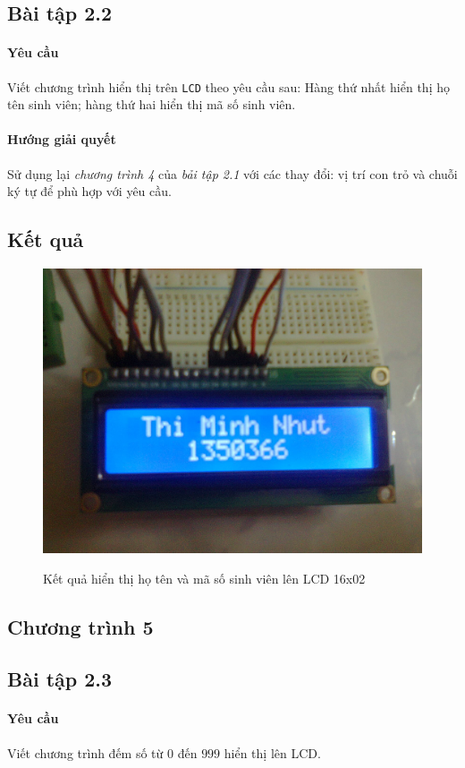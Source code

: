 \subsection{Bài tập 2.2}
\paragraph{Yêu cầu}Viết chương trình hiển thị trên \verb|LCD| theo yêu cầu sau: Hàng thứ nhất hiển thị họ tên sinh viên; hàng thứ hai hiển thị mã số sinh viên.
\paragraph{Hướng giải quyết}Sử dụng lại \emph{chương trình 4} của \emph{bải tập 2.1} với các thay đổi: vị trí con trỏ và chuỗi ký tự để phù hợp với yêu cầu.
\subsection*{Kết quả}
\begin{figure}[!h]
\begin{center}
  {\includegraphics[width=.5\linewidth]{bai-2/image/2-2}}
\end{center}
\caption[]{Kết quả hiển thị họ tên và mã số sinh viên lên LCD 16x02}
\end{figure}
\subsection*{Chương trình 5}

\subsection{Bài tập 2.3}
\paragraph{Yêu cầu}Viết chương trình đếm số từ $0$ đến $999$ hiển thị lên LCD.
